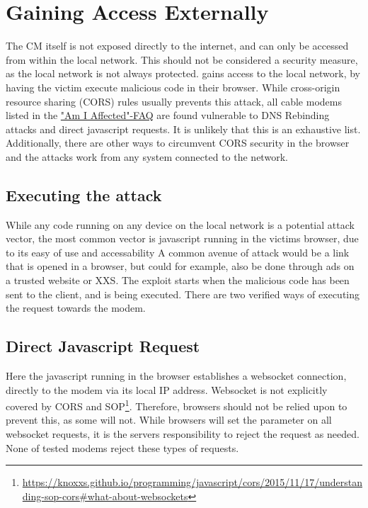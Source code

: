 \chapter{Gaining Access Externally}
\label{cha:dns}
The CM itself is not exposed directly to the internet, and can only be accessed from within the local network.
This should not be considered a security measure, as the local network is not always protected.
\exploitname{} gains access to the local network, by having the victim execute malicious code in their browser.
While cross-origin resource sharing (CORS) rules usually prevents this attack, all cable modems listed in the \href{https://cablehaunt.com/#faq-am-i-affected}{"Am I Affected"-FAQ} are found vulnerable to DNS Rebinding attacks and direct javascript requests.
It is unlikely that this is an exhaustive list.
Additionally, there are other ways to circumvent CORS security in the browser and the attacks work from any system connected to the network.

\section{Executing the attack}
While any code running on any device on the local network is a potential attack vector, the most common vector is javascript running in the victims browser, due to its easy of use and accessability
A common avenue of attack would be a link that is opened in a browser, but could for example, also be done through ads on a trusted website or XXS.
The exploit starts when the malicious code has been sent to the client, and is being executed.
There are two verified ways of executing the request towards the modem.

\section{Direct Javascript Request}
Here the javascript running in the browser establishes a websocket connection, directly to the modem via its local IP address.
Websocket is not explicitly covered by CORS and SOP\footnote{\url{https://knoxxs.github.io/programming/javascript/cors/2015/11/17/understanding-sop-cors\#what-about-websockets}}. 
Therefore, browsers should not be relied upon to prevent this, as some will not. 
While browsers will set the  parameter on all websocket requests, it is the servers responsibility to reject the request as needed. 
None of tested modems reject these types of requests.

